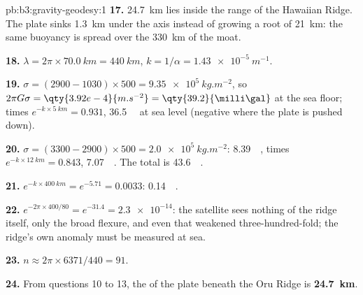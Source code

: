 \begin{solution}{pb:b3:gravity-geodesy:1}
\textbf{17.} \qty{24.7}{km} lies inside the range of the Hawaiian Ridge. The
plate sinks \qty{1.3}{km} under the axis instead of growing a root of
\qty{21}{km}: the same buoyancy is spread over the \qty{330}{km} of the moat.

\textbf{18.} $\lambda = 2\pi\times\qty{70.0}{km} = \qty{440}{km}$,
$k = 1/\alpha = \qty{1.43e-5}{m^{-1}}$.

\textbf{19.} $\sigma = (2900 - 1030)\times500 = \qty{9.35e5}{kg.m^{-2}}$, so
$2\pi G\sigma = \qty{3.92e-4}{m.s^{-2}} = \qty{39.2}{\milli\gal}$ at the sea floor;
times $e^{-k\times\qty{5}{km}} = 0.931$, \qty{36.5}{\milli\gal} at sea level
(negative where the plate is pushed down).

\textbf{20.} $\sigma = (3300 - 2900)\times500 = \qty{2.0e5}{kg.m^{-2}}$:
\qty{8.39}{\milli\gal}, times $e^{-k\times\qty{12}{km}} = 0.843$,
\qty{7.07}{\milli\gal}. The total is \qty{43.6}{\milli\gal}.

\textbf{21.} $e^{-k\times\qty{400}{km}} = e^{-5.71} = 0.0033$: \qty{0.14}{\milli\gal}.

\textbf{22.} $e^{-2\pi\times400/80} = e^{-31.4} = \num{2.3e-14}$: the satellite
sees nothing of the ridge itself, only the broad flexure, and even that
weakened three-hundred-fold; the ridge's own anomaly must be measured at sea.

\textbf{23.} $n \approx 2\pi\times6371/440 = 91$.

\textbf{24.} From questions 10 to 13, the  of the
plate beneath the Oru Ridge is
\textbf{\qty[text-series-to-math=true]{24.7}{km}}.
\end{solution}
